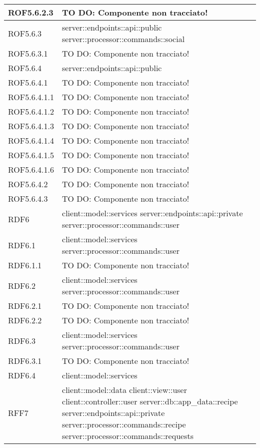 \begin{center}
\begin{longtable}{| p{4cm} | p{8cm} |}
\hline
ROF5.6.2.3 & TO DO: Componente non tracciato! \\
\hline
ROF5.6.3 & server::endpoints::api::public \newline server::processor::commands::social \\
\hline
ROF5.6.3.1 & TO DO: Componente non tracciato! \\
\hline
ROF5.6.4 & server::endpoints::api::public \\
\hline
ROF5.6.4.1 & TO DO: Componente non tracciato! \\
\hline
ROF5.6.4.1.1 & TO DO: Componente non tracciato! \\
\hline
ROF5.6.4.1.2 & TO DO: Componente non tracciato! \\
\hline
ROF5.6.4.1.3 & TO DO: Componente non tracciato! \\
\hline
ROF5.6.4.1.4 & TO DO: Componente non tracciato! \\
\hline
ROF5.6.4.1.5 & TO DO: Componente non tracciato! \\
\hline
ROF5.6.4.1.6 & TO DO: Componente non tracciato! \\
\hline
ROF5.6.4.2 & TO DO: Componente non tracciato! \\
\hline
ROF5.6.4.3 & TO DO: Componente non tracciato! \\
\hline
RDF6 & client::model::services \newline server::endpoints::api::private \newline server::processor::commands::user \\
\hline
RDF6.1 & client::model::services \newline server::processor::commands::user \\
\hline
RDF6.1.1 & TO DO: Componente non tracciato! \\
\hline
RDF6.2 & client::model::services \newline server::processor::commands::user \\
\hline
RDF6.2.1 & TO DO: Componente non tracciato! \\
\hline
RDF6.2.2 & TO DO: Componente non tracciato! \\
\hline
RDF6.3 & client::model::services \newline server::processor::commands::user \\
\hline
RDF6.3.1 & TO DO: Componente non tracciato! \\
\hline
RDF6.4 & client::model::services \\
\hline
RFF7 & client::model::data \newline client::view::user \newline client::controller::user \newline server::db::app\_data::recipe \newline server::endpoints::api::private \newline server::processor::commands::recipe \newline server::processor::commands::requests \\

\end{longtable}
\end{center}
